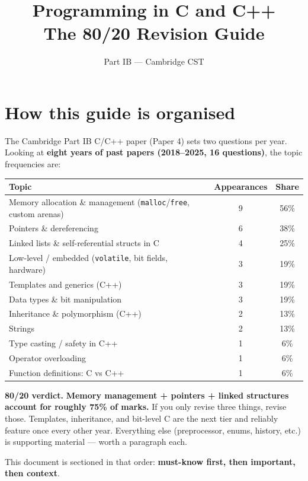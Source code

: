 \documentclass[11pt,a4paper]{article}
\title{\vspace{-1.5cm}\textbf{Programming in C and C++} \\[2pt] \large The 80/20 Revision Guide}
\author{\small Part IB --- Cambridge CST}
\date{}
\begin{document}
\maketitle
\vspace{-0.8cm}

\section*{How this guide is organised}

The Cambridge Part IB C/C++ paper (Paper 4) sets two questions per year. Looking at \textbf{eight years of past papers (2018--2025, 16 questions)}, the topic frequencies are:

\begin{center}
\begin{tabular}{lcc}
\hline
\textbf{Topic} & \textbf{Appearances} & \textbf{Share} \\
\hline
Memory allocation \& management (\texttt{malloc}/\texttt{free}, custom arenas) & 9 & 56\% \\
Pointers \& dereferencing & 6 & 38\% \\
Linked lists \& self-referential structs in C & 4 & 25\% \\
Low-level / embedded (\texttt{volatile}, bit fields, hardware) & 3 & 19\% \\
Templates and generics (C++) & 3 & 19\% \\
Data types \& bit manipulation & 3 & 19\% \\
Inheritance \& polymorphism (C++) & 2 & 13\% \\
Strings & 2 & 13\% \\
Type casting / safety in C++ & 1 & 6\% \\
Operator overloading & 1 & 6\% \\
Function definitions: C vs C++ & 1 & 6\% \\
\hline
\end{tabular}
\end{center}

\textbf{80/20 verdict.} \textbf{Memory management + pointers + linked structures account for roughly 75\% of marks.} If you only revise three things, revise those. Templates, inheritance, and bit-level C are the next tier and reliably feature once every other year. Everything else (preprocessor, enums, history, etc.) is supporting material --- worth a paragraph each.

This document is sectioned in that order: \textbf{must-know first, then important, then context}.
\end{document}
